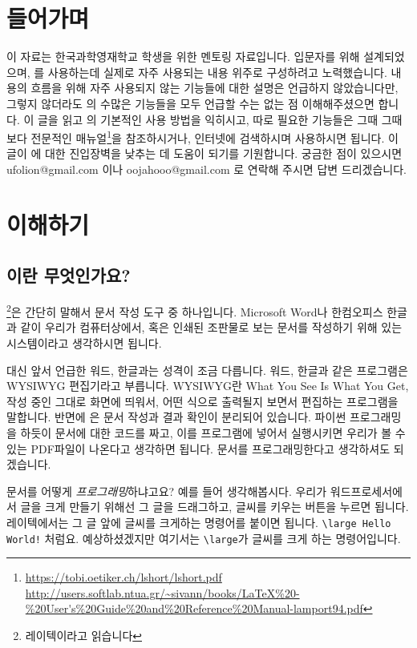 
\section*{들어가며}
이 자료는 한국과학영재학교 학생을 위한 \lt{} 멘토링 자료입니다.
입문자를 위해 설계되었으며, \lt 를 사용하는데 실제로 자주 사용되는 내용 위주로 구성하려고 노력했습니다.
내용의 흐름을 위해 자주 사용되지 않는 기능들에 대한 설명은 언급하지 않았습니다만, 그렇지 않더라도 \lt 의 수많은 기능들을 모두 언급할 수는 없는 점 이해해주셨으면 합니다.
이 글을 읽고 \lt 의 기본적인 사용 방법을 익히시고, 따로 필요한 기능들은 그때 그때 보다 전문적인 매뉴얼\footnote{\url{https://tobi.oetiker.ch/lshort/lshort.pdf}\\ \url{http://users.softlab.ntua.gr/~sivann/books/LaTeX\%20-\%20User's\%20Guide\%20and\%20Reference\%20Manual-lamport94.pdf}}을 참조하시거나, 인터넷에 검색하시며 사용하시면 됩니다.
이 글이 \lt 에 대한 진입장벽을 낮추는 데 도움이 되기를 기원합니다.
궁금한 점이 있으시면 ufolion@gmail.com 이나 oojahooo@gmail.com 로 연락해 주시면 답변 드리겠습니다.
\section{\lt{} 이해하기}
\label{sec:1}

\subsection{\lt 이란 무엇인가요?}
\label{sec:1.1}
\lt \footnote{레이텍이라고 읽습니다}은 간단히 말해서 문서 작성 도구 중 하나입니다.
Microsoft Word나 한컴오피스 한글과 같이 우리가 컴퓨터상에서, 혹은 인쇄된 조판물로 보는 문서를 작성하기 위해 있는 시스템이라고 생각하시면 됩니다.

대신 앞서 언급한 워드, 한글과는 성격이 조금 다릅니다.
워드, 한글과 같은 프로그램은 WYSIWYG 편집기라고 부릅니다.
WYSIWYG란 What You See Is What You Get, 작성 중인 그대로 화면에 띄워서, 어떤 식으로 출력될지 보면서 편집하는 프로그램을 말합니다.
반면에 \lt 은 문서 작성과 결과 확인이 분리되어 있습니다.
파이썬 프로그래밍을 하듯이 문서에 대한 코드를 짜고, 이를 \lt{} 프로그램에 넣어서 실행시키면 우리가 볼 수 있는 PDF파일이 나온다고 생각하면 됩니다.
문서를 프로그래밍한다고 생각하셔도 되겠습니다.

문서를 어떻게 \emph{프로그래밍}하냐고요?
예를 들어 생각해봅시다.
우리가 워드프로세서에서 글을 크게 만들기 위해선 그 글을 드래그하고, 글씨를 키우는 버튼을 누르면 됩니다.
레이텍에서는 그 글 앞에 글씨를 크게하는 명령어를 붙이면 됩니다. \verb|\large Hello World!| 처럼요.
예상하셨겠지만 여기서는 \verb|\large|가 글씨를 크게 하는 명령어입니다.

